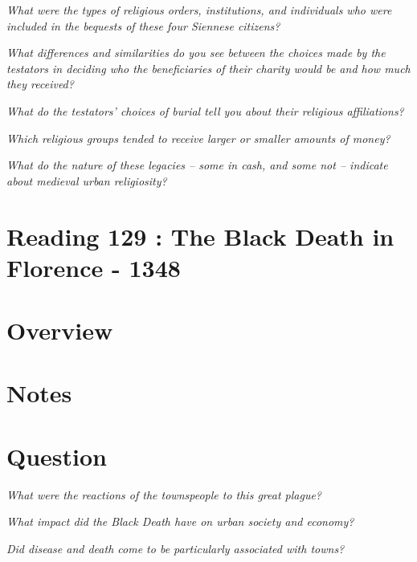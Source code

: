 \documentclass[12pt]{article}
\begin{document}
\textit{What were the types of religious orders, institutions, and individuals who were included in the bequests of these four Siennese citizens?}

\textit{What differences and similarities do you see between the choices made by the testators in deciding who the beneficiaries of their charity would be and how much they received?}

\textit{What do the testators' choices of burial tell you about their religious affiliations?}

\textit{Which religious groups tended to receive larger or smaller amounts of money?}

\textit{What do the nature of these legacies -- some in cash, and some not -- indicate about medieval urban religiosity?}

\section*{Reading 129 : The Black Death in Florence - 1348}

\section*{Overview}

\section*{Notes}

\section*{Question}

\textit{What were the reactions of the townspeople to this great plague?}

\textit{What impact did the Black Death have on urban society and economy?}

\textit{Did disease and death come to be particularly associated with towns?}
\end{document}
